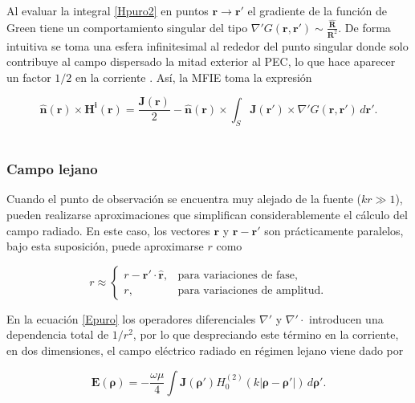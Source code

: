 \documentclass[11pt,a4paper,twoside,pdf]{article}
\numberwithin{equation}{section}
\begin{document}
Al evaluar la integral \ref{Hpuro2} en puntos $\bm{r} \to \bm{r'}$ el gradiente de la función de Green tiene un comportamiento singular del tipo $\nabla'G(\mathbf{r}, \mathbf{r}') \sim \frac{\bm{\hat{R}}}{\bm{R}^2}$. De forma intuitiva se toma una esfera infinitesimal al rededor del punto singular donde solo contribuye al campo dispersado la mitad exterior al PEC, lo que hace aparecer un factor $1/2$ en la corriente \cite{gibson2021method}. Así, la MFIE toma la expresión




\begin{equation}
\bm{\mathbf{\hat{n}}}(\bm{r}) \times \mathbf{H^i}(\mathbf{r})
= \frac{\bm{J(\mathbf{r})}}{2} - \mathbf{\hat{n}} (\mathbf{r}) \times  \int_{S}
 \mathbf{J}(\mathbf{r}') \times \nabla'
G(\mathbf{r},\mathbf{r}')
\, d\bm{r'}.
\label{MFIE}
\end{equation}\\



\subsubsection{Campo lejano}



Cuando el punto de observación se encuentra muy alejado de la fuente ($kr \gg 1$), pueden realizarse aproximaciones que simplifican considerablemente el cálculo del campo radiado. En este caso, los vectores $\mathbf{r}$ y $\mathbf{r}-\mathbf{r}'$ son prácticamente paralelos, bajo esta suposición, puede aproximarse $r$ como \cite{martin2021campo}

\begin{equation}
r \approx
\begin{cases}
r - \mathbf{r}' \cdot \hat{\mathbf{r}}, & \text{para variaciones de fase}, \\
r, & \text{para variaciones de amplitud}.
\end{cases}
\label{eq:farfield_r}
\end{equation}

En la ecuación \ref{Epuro} los operadores diferenciales $\nabla'$ y $\nabla' \cdot$ introducen una dependencia total de $1/r^2$, por lo que despreciando este término en la corriente, en dos dimensiones, el campo eléctrico radiado en régimen lejano viene dado por

\begin{equation}
\mathbf{E}(\boldsymbol{\rho})
=
- \frac{\omega \mu}{4}
\int
\mathbf{J}(\boldsymbol{\rho}')
H_0^{(2)}\left(k|\boldsymbol{\rho}-\boldsymbol{\rho}'|\right)
\, d\boldsymbol{\rho}'.
\label{eq:farfield_2D}
\end{equation}
\end{document}
